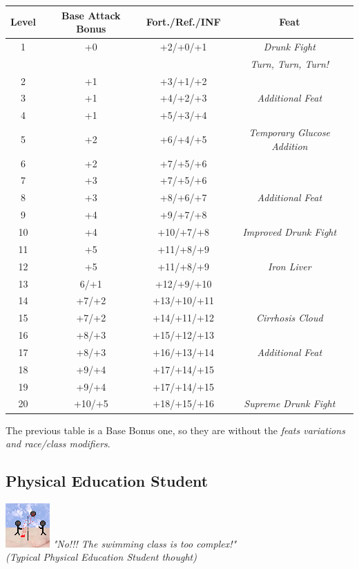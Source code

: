 \documentclass[ letterpaper,12pt]{article}
\begin{document}
\begin{center} \begin{tabular}{|c||c|c|c|}
\hline
{\bf Level}&{\bf Base Attack Bonus}&{\bf Fort./Ref./INF}&{\bf Feat}\\
\hline
1&+0&+2/+0/+1&{\it Drunk Fight}\\
&&&{\it Turn, Turn, Turn!} \\
\hline
2&+1&+3/+1/+2&\\
\hline
3&+1&+4/+2/+3&{\it Additional Feat}\\
\hline
4&+1&+5/+3/+4&\\
\hline
5&+2&+6/+4/+5&{\it Temporary Glucose Addition}\\
\hline
6&+2&+7/+5/+6&\\
\hline
7&+3&+7/+5/+6&\\
\hline
8&+3&+8/+6/+7&{\it Additional Feat}\\
\hline
9&+4&+9/+7/+8&\\
\hline
10&+4&+10/+7/+8&{\it Improved Drunk Fight}\\
\hline
11&+5&+11/+8/+9&\\
\hline
12&+5&+11/+8/+9&{\it Iron Liver}\\
\hline
13&6/+1&+12/+9/+10&\\
\hline
14&+7/+2&+13/+10/+11&\\
\hline
15&+7/+2&+14/+11/+12&{\it Cirrhosis Cloud}\\
\hline
16&+8/+3&+15/+12/+13&\\
\hline
17&+8/+3&+16/+13/+14&{\it Additional Feat}\\
\hline
18&+9/+4&+17/+14/+15&\\
\hline
19&+9/+4&+17/+14/+15&\\
\hline
20&+10/+5&+18/+15/+16&{\it Supreme Drunk Fight}\\
\hline
\end{tabular} \end{center}

The previous table is a Base Bonus one, so they are without the {\it feats variations and race/class modifiers}.\\

\subsection{Physical Education Student}
\includegraphics{../data/classes/Img/edfisica.png}
{\it "No!!! The swimming class is too complex!"\\(Typical Physical Education Student thought)}\\
\end{document}
